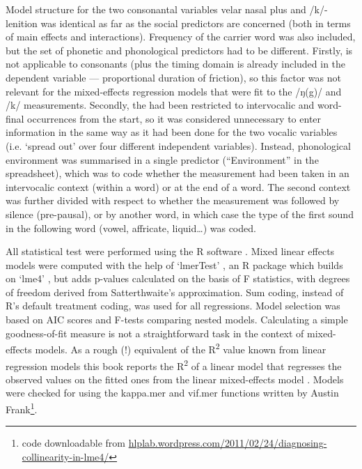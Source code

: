 Model structure for the two consonantal variables velar nasal plus and /k/-lenition was identical as far as the social predictors are concerned (both in terms of main effects and interactions).
Frequency of the carrier word was also included, but the set of phonetic and phonological predictors had to be different.
Firstly,  is not applicable to consonants (plus the timing domain is already included in the dependent variable --- proportional duration of friction), so this factor was not relevant for the mixed-effects regression models that were fit to the /ŋ(g)/ and /k/ measurements.
Secondly, the  had been restricted to intervocalic and word-final occurrences from the start, so it was considered unnecessary to enter information in the same way as it had been done for the two vocalic variables (i.e. `spread out' over four different independent variables).
Instead, phonological environment was summarised in a single predictor (``Environment'' in the spreadsheet), which was to code whether the measurement had been taken in an intervocalic context (within a word) or at the end of a word.
The second context was further divided with respect to whether the measurement was followed by silence (pre-pausal), or by another word, in which case the type of the first sound in the following word (vowel, affricate, liquid\ldots) was coded.

All statistical test were performed using the R software \parencite{R}.
Mixed linear effects models were computed with the help of `lmerTest' \parencite{lmerTest}, an R package which builds on `lme4' \parencite{lme4}, but adds p-values calculated on the basis of F statistics, with degrees of freedom derived from Satterthwaite's approximation.
Sum coding, instead of R's default treatment coding, was used for all regressions.
Model selection was based on AIC scores and F-tests comparing nested models.
Calculating a simple goodness-of-fit measure is not a straightforward task in the context of mixed-effects models.
As a rough (!) equivalent of the R\textsuperscript{2} value known from linear regression models this book reports the R\textsuperscript{2} of a linear model that regresses the observed values on the fitted ones from the linear mixed-effects model \parencite[cf.][]{glmwiki}.
Models were checked for  using the kappa.mer and vif.mer functions written by Austin Frank\footnote{code downloadable from \url{hlplab.wordpress.com/2011/02/24/diagnosing-collinearity-in-lme4/}}.
